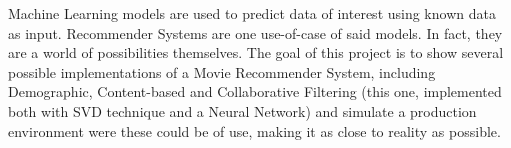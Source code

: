 \begin{center}
    \begin{minipage}{0.85\textwidth}
        Machine Learning models are used to predict data of interest using known data as input.
        Recommender Systems are one use-of-case of said models.
        In fact, they are a world of possibilities themselves.
        The goal of this project is to show several possible implementations of a Movie Recommender System,
        including Demographic, Content-based and Collaborative Filtering
        (this one, implemented both with SVD technique and a Neural Network)
        and simulate a production environment were these could be of use, making it as close to reality as possible. 
    \end{minipage}
\end{center}